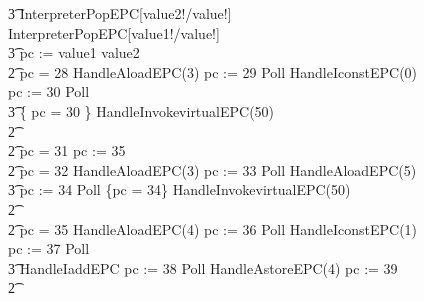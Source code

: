 \begin{figure}[t!]
{\begin{circus}
    \t3 \lschexpract InterpreterPopEPC[value2!/value!] \rschexpract \circseq \lschexpract InterpreterPopEPC[value1!/value!] \rschexpract \circseq \\
    \t3 pc := \IF value1 \leq value2   \\
    \t2 {} \circelse pc = 28 \circthen HandleAloadEPC(3) \circseq pc := 29 \circseq Poll \circseq HandleIconstEPC(0) \circseq pc := 30 \circseq Poll \circseq \\
    \t3 \{ pc = 30 \} \circseq HandleInvokevirtualEPC(50) \\
    \t2 {} \cdots {} \\ 
    \t2 {} \circelse pc = 31 \circthen pc := 35 \\
    \t2 {} \circelse pc = 32 \circthen HandleAloadEPC(3) \circseq pc := 33 \circseq Poll \circseq HandleAloadEPC(5) \circseq \\
    \t3 pc := 34 \circseq Poll \circseq \{pc = 34\} \circseq HandleInvokevirtualEPC(50) \\
    \t2 {} \cdots {} \\
    \t2 {} \circelse pc = 35 \circthen HandleAloadEPC(4) \circseq pc := 36 \circseq Poll \circseq HandleIconstEPC(1) \circseq pc := 37 \circseq Poll \circseq \\
    \t3 HandleIaddEPC \circseq pc := 38 \circseq Poll \circseq HandleAstoreEPC(4) \circseq pc := 39 \\
    \t2 {} \cdots {} \\

\end{circus}}
\end{figure}
